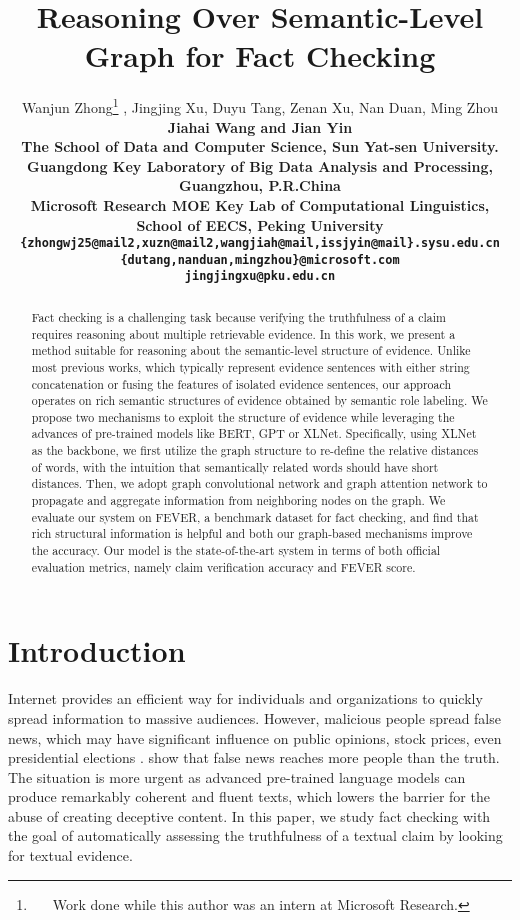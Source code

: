 \documentclass[11pt,a4paper]{article}
\title{Reasoning Over Semantic-Level Graph for Fact Checking}
\author{Wanjun Zhong\thanks{\ \ \ Work done while this author was an intern at Microsoft Research.} , Jingjing Xu, Duyu Tang, Zenan Xu, Nan Duan, Ming Zhou\\
	\bf Jiahai Wang and Jian Yin\\
	 The School of Data and Computer Science, Sun Yat-sen University.\\
	Guangdong Key Laboratory of Big Data Analysis and Processing, Guangzhou, P.R.China\\
	 Microsoft Research  MOE Key Lab of Computational Linguistics, School of EECS, Peking University\\
	{\tt \{zhongwj25@mail2,xuzn@mail2,wangjiah@mail,issjyin@mail\}.sysu.edu.cn}\\
	{\tt \{dutang,nanduan,mingzhou\}@microsoft.com}\\ 
	{\tt jingjingxu@pku.edu.cn}\\
}
\date{}
\begin{document}
\maketitle
\begin{abstract}
Fact checking is a challenging task because verifying the truthfulness of a claim requires reasoning about multiple retrievable {evidence}. In this work, we present a method suitable for reasoning about the semantic-level structure of evidence. Unlike most previous {works}, which typically {represent} evidence sentences with either string concatenation or fusing the features of isolated evidence sentences, our approach operates on rich semantic structures of evidence obtained by semantic role labeling. We propose two mechanisms to exploit the structure of evidence while leveraging the advances of pre-trained models like BERT, \mbox{GPT} or XLNet. Specifically, using XLNet as the backbone, we first utilize the graph structure to re-define the relative distances of words, with the intuition that semantically related words should have short distances. Then, we adopt graph convolutional network and graph attention network to propagate and aggregate information from neighboring nodes on the graph. We evaluate our system on FEVER, a benchmark dataset for fact checking, and find that rich structural information is helpful and both our graph-based mechanisms improve the accuracy. Our model is the state-of-the-art system in terms of both official evaluation metrics, namely claim verification accuracy and FEVER score.
\end{abstract}

\section{Introduction}
Internet provides an efficient way for individuals and organizations to quickly spread information to massive audiences. 
However, 
malicious people spread false news, which may have significant influence on public opinions, stock prices, even presidential elections \cite{faris2017partisanship}.
 show that false news reaches more people than the truth.
The situation is more urgent as advanced pre-trained language models \cite{radford2019language} can produce remarkably coherent and fluent texts, which lowers the barrier for the abuse of creating deceptive content.
In this paper, we study fact checking
with the goal of automatically 
assessing the truthfulness
of a textual claim by looking for textual evidence.  
\end{document}
